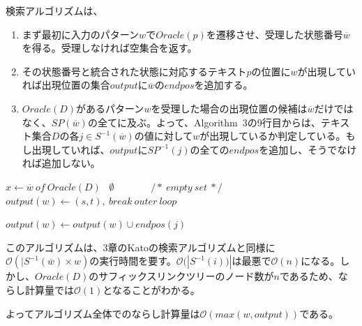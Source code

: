 \documentclass[11pt,a4paper]{jreport}
\begin{document}
  検索アルゴリズムは、
  \begin{enumerate}
    \item まず最初に入力のパターン$w$で$Oracle(p)$を遷移させ、受理した状態番号$\overline{w}$を得る。受理しなければ空集合を返す。
    \item その状態番号と統合された状態に対応するテキスト$p$の位置に$w$が出現していれば出現位置の集合$output$に$\overline{w}のendpos$を追加する。
    \item $Oracle(D)$があるパターン$w$を受理した場合の出現位置の候補は$\overline{w}$だけではなく、$SP(\overline{w})$の全てに及ぶ。よって、Algorithm\ 3の9行目からは、テキスト集合$D$の各$j \in S^{-1}(\overline{w})$の値に対して$w$が出現しているか判定している。もし出現していれば、$outputにSP^{-1}(j)の全てのendpos$を追加し、そうでなければ追加しない。
  \end{enumerate}

  \begin{algorithm}
    \caption{$\textbf{search}(Oracle(D), w)$}
    \label{alg9}
    \begin{algorithmic}[1]
        \State $x \leftarrow \overline{w}\ of\ Oracle(D)$
      \Else
      \ \Return $\emptyset \ \ \ \ \ \ \ \ \ \ \ \ \ \ \ \ \ /*\ empty\ set\ */$
      \EndIf
            \State $output(w)\leftarrow (s,t),\ break\ outer\ loop$
          \EndIf
        \EndFor
      \EndFor

              \State $output(w)\leftarrow output(w) \cup endpos(j)$
            \EndFor
          \EndIf
        \EndFor
      \EndFor
    \end{algorithmic}
  \end{algorithm}

  このアルゴリズムは、3章のKatoの検索アルゴリズムと同様に$\mathcal{O}(|S^{-1}(\overline{w}) \times w)$の実行時間を要す。$\mathcal{O}(|S^{-1}(i))|$は最悪で$\mathcal{O}(n)$になる。しかし、$Oracle(D)$のサフィックスリンクツリーのノード数が$n$であるため、ならし計算量では$\mathcal{O}(1)$となることがわかる。

  よってアルゴリズム全体でのならし計算量は$\mathcal{O}(max(w, output))$である。
\end{document}
